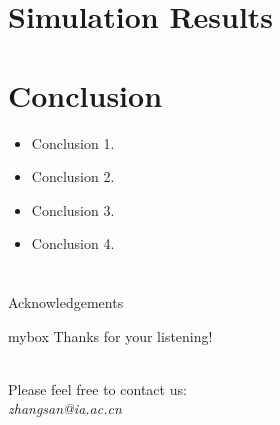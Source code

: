 \documentclass{beamer}
\begin{document}
	\section[Simulation Results]{Simulation Results}
	\begin{frame}
	\end{frame}





	\section[Conclusion]{Conclusion}
	\begin{frame}
		\begin{itemize}
			\item Conclusion 1.
			\item Conclusion 2.
			\item Conclusion 3.
			\item Conclusion 4.
		\end{itemize}
	\end{frame}


	\section{}
	\begin{frame}{Acknowledgements}
		\begin{center}
			\begin{minipage}{1\textwidth}
				\begin{beamercolorbox}[wd=0.6\textwidth, rounded=true, shadow=true]{mybox}
					\LARGE \centering Thanks for your listening!
				\end{beamercolorbox}
			\end{minipage}
			\\[20pt]
			Please feel free to contact us:
			\\[10pt]
			\textit{zhangsan@ia.ac.cn}
		\end{center}
	\end{frame}
\end{document}

